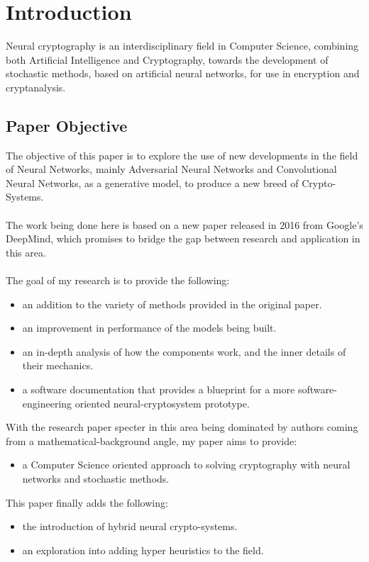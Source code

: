 \documentclass[12pt]{article}
\begin{document}
\section{\textbf{Introduction}}\label{sec:introduction}
Neural cryptography is an interdisciplinary field in Computer Science, combining both Artificial Intelligence and Cryptography, towards the development of stochastic methods, based on artificial neural networks, for use in encryption and cryptanalysis.
\subsection{\textbf{Paper Objective}}
The objective of this paper is to explore the use of new developments in the field of Neural Networks, mainly Adversarial Neural Networks and Convolutional Neural Networks, as a generative model, to produce a new breed of Crypto-Systems.\\\\
The work being done here is based on a new paper released in 2016 from Google's DeepMind, which promises to bridge the gap between research and application in this area.\\\\
The goal of my research is to provide the following:
\begin{itemize}
	\item an addition to the variety of methods provided in the original paper.
	\item an improvement in performance of the models being built.
	\item an in-depth analysis of how the components work, and the inner details of their mechanics.
	\item a software documentation that provides a blueprint for a more software-engineering oriented neural-cryptosystem prototype.
\end{itemize}
With the research paper specter in this area being dominated by authors coming from a mathematical-background angle, my paper aims to provide:
\begin{itemize}
	\item a Computer Science oriented approach to solving cryptography with neural networks and stochastic methods.
\end{itemize}
This paper finally adds the following:
\begin{itemize}
	\item the introduction of hybrid neural crypto-systems.
	\item an exploration into adding hyper heuristics to the field.
\end{itemize}
\newpage
\end{document}
